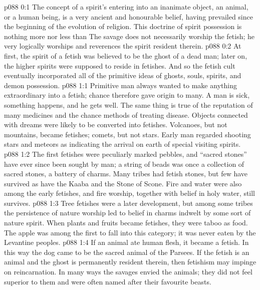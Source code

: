 \author{Brilliant Evening Star}
\vs p088 0:1 The concept of a spirit’s entering into an inanimate object, an animal, or a human being, is a very ancient and honourable belief, having prevailed since the beginning of the evolution of religion. This doctrine of spirit possession is nothing more nor less than  The savage does not necessarily worship the fetish; he very logically worships and reverences the spirit resident therein.
\vs p088 0:2 At first, the spirit of a fetish was believed to be the ghost of a dead man; later on, the higher spirits were supposed to reside in fetishes. And so the fetish cult eventually incorporated all of the primitive ideas of ghosts, souls, spirits, and demon possession.
\vs p088 1:1 Primitive man always wanted to make anything extraordinary into a fetish; chance therefore gave origin to many. A man is sick, something happens, and he gets well. The same thing is true of the reputation of many medicines and the chance methods of treating disease. Objects connected with dreams were likely to be converted into fetishes. Volcanoes, but not mountains, became fetishes; comets, but not stars. Early man regarded shooting stars and meteors as indicating the arrival on earth of special visiting spirits.
\vs p088 1:2 The first fetishes were peculiarly marked pebbles, and “sacred stones” have ever since been sought by man; a string of beads was once a collection of sacred stones, a battery of charms. Many tribes had fetish stones, but few have survived as have the Kaaba and the Stone of Scone. Fire and water were also among the early fetishes, and fire worship, together with belief in holy water, still survives.
\vs p088 1:3 Tree fetishes were a later development, but among some tribes the persistence of nature worship led to belief in charms indwelt by some sort of nature spirit. When plants and fruits became fetishes, they were taboo as food. The apple was among the first to fall into this category; it was never eaten by the Levantine peoples.
\vs p088 1:4 If an animal ate human flesh, it became a fetish. In this way the dog came to be the sacred animal of the Parsees. If the fetish is an animal and the ghost is permanently resident therein, then fetishism may impinge on reincarnation. In many ways the savages envied the animals; they did not feel superior to them and were often named after their favourite beasts.
